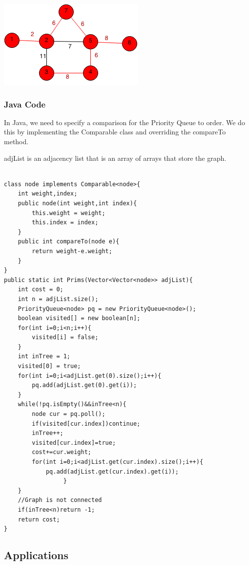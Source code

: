 \documentclass[11pt,oneside]{book}
\makeatletter
\def\maxwidth#1{\ifdim\Gin@nat@width>#1 #1\else\Gin@nat@width\fi}
\makeatother
\begin{document}
\vspace{5px}\includegraphics[width=\maxwidth{\textwidth}]{prim7.png}

\subsubsection{Java Code}

In Java, we need to specify a comparison for the Priority Queue to order. We do this by implementing the Comparable class and overriding the compareTo method.

adjList is an adjacency list that is an array of arrays that store the graph.

\begin{lstlisting}

class node implements Comparable<node>{
    int weight,index;
    public node(int weight,int index){
        this.weight = weight;
        this.index = index;
    }
    public int compareTo(node e){
        return weight-e.weight;
    }
}
public static int Prims(Vector<Vector<node>> adjList){
    int cost = 0;
    int n = adjList.size();
    PriorityQueue<node> pq = new PriorityQueue<node>();
    boolean visited[] = new boolean[n];
    for(int i=0;i<n;i++){
        visited[i] = false;
    }
    int inTree = 1;
    visited[0] = true;
    for(int i=0;i<adjList.get(0).size();i++){
        pq.add(adjList.get(0).get(i));
    }
    while(!pq.isEmpty()&&inTree<n){
        node cur = pq.poll();
        if(visited[cur.index])continue;
        inTree++;
        visited[cur.index]=true;
        cost+=cur.weight;
        for(int i=0;i<adjList.get(cur.index).size();i++){
            pq.add(adjList.get(cur.index).get(i));          
                 }
    }
    //Graph is not connected
    if(inTree<n)return -1;
    return cost;
}
\end{lstlisting}

\subsection{Applications}
\end{document}

